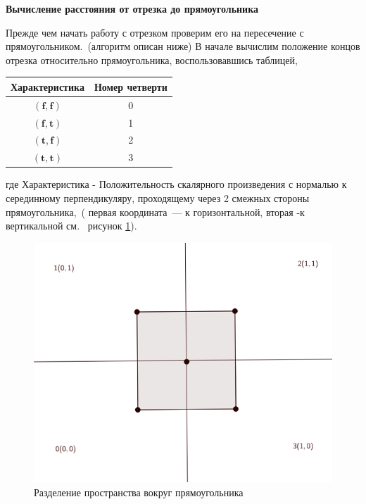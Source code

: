 \textbf{Вычисление расстояния от отрезка до прямоугольника}

Прежде чем начать работу с отрезком проверим его на пересечение с прямоугольником.~(алгоритм описан ниже)
В начале вычислим положение концов отрезка относительно прямоугольника, воспользовавшись таблицей,
\begin{center}
\begin{tabular}{|c|c|}
\hline
Характеристика & Номер четверти \\
\hline 
$(\mathbf{f},\mathbf{f})$ & 0 \\ 
\hline 
$(\mathbf{f},\mathbf{t})$ & 1 \\
\hline
$(\mathbf{t},\mathbf{f})$ & 2 \\
\hline
$(\mathbf{t},\mathbf{t})$ & 3 \\
\hline
\end{tabular} 
\end{center}
где Характеристика - Положительность скалярного произведения с нормалью к серединному перпендикуляру, проходящему через 2 смежных стороны прямоугольника,~( первая координата~--- к горизонтальной, вторая -к вертикальной см.~ рисунок \ref{fig:conv_rect}).
\begin{figure}[ht!]
\begin{center}
\includegraphics[scale=0.4]{images/conv_rect}
\end{center}
\vspace*{-8mm}
\caption{Разделение пространства вокруг прямоугольника}\label{fig:conv_rect}
\end{figure}

